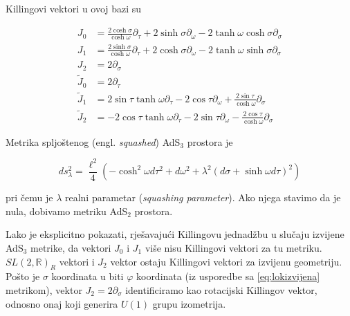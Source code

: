 \noindent Killingovi vektori u ovoj bazi su

\begin{equation*}
\begin{split}
J_0&=\frac{2\cosh\sigma}{\cosh\omega}\partial_\tau+2\sinh\sigma\partial_\omega-2\tanh\omega\cosh\sigma\partial_\sigma\\
J_1&=\frac{2\sinh\sigma}{\cosh\omega}\partial_\tau+2\cosh\sigma\partial_\omega-2\tanh\omega\sinh\sigma\partial_\sigma\\
J_2&=2\partial_\sigma\\
\tilde{J}_0&=2\partial_\tau\\
\tilde{J}_1&=2\sin\tau\tanh\omega\partial_\tau-2\cos\tau\partial_\omega+\frac{2\sin\tau}{\cosh\omega}\partial_\sigma\\
\tilde{J}_2&=-2\cos\tau\tanh\omega\partial_\tau-2\sin\tau\partial_\omega-\frac{2\cos\tau}{\cosh\omega}\partial_\sigma
\end{split}
\end{equation*}

\noindent Metrika spljoštenog (engl. \textit{squashed})  AdS${}_3$ prostora je

\begin{equation*}
ds^2_\lambda=\frac{\ell^2}{4}\left(-\cosh^2\omega d\tau^2+d\omega^2+\lambda^2(d\sigma+\sinh \omega d\tau)^2\right)
\end{equation*}

\noindent pri čemu je $\lambda$ realni parametar (\textit{squashing parameter}). Ako njega stavimo da je nula, dobivamo metriku AdS${}_2$ prostora. %

Lako je eksplicitno pokazati, rješavajući Killingovu jednadžbu u slučaju izvijene AdS${}_3$ metrike, da vektori $J_0$ i $J_1$ više nisu Killingovi vektori za tu metriku. $SL(2,\mathbb{R})_R$ vektori i $J_2$ vektor ostaju Killingovi vektori za izvijenu geometriju. Pošto je $\sigma$ koordinata u biti $\varphi$ koordinata (iz usporedbe sa \eqref{eq:lokizvijena} metrikom), vektor $J_2=2\partial_\sigma$ identificiramo kao rotacijski Killingov vektor, odnosno onaj koji generira $U(1)$ grupu izometrija.


